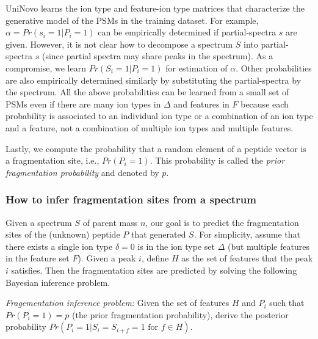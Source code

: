  UniNovo learns the ion type and feature-ion type matrices that characterize  the generative model of the PSMs in the training dataset.  For example, $\alpha=Pr(s_{i}=1|P_i=1)$ can be empirically determined if partial-spectra $s$ are given. However, it is not clear how to decompose a spectrum $S$ into partial-spectra $s$ (since partial spectra may share peaks in the spectrum). As a compromise, we learn $Pr(S_{i}=1|P_i=1)$ for estimation of $\alpha$. Other probabilities are also empirically determined similarly by substituting the partial-spectra by the spectrum. 
%
All the above probabilities can be learned from a small set of PSMs 
even if there are many ion types in $\Delta$ and features in $F$ because each probability is associated to an individual ion type  or a combination of an ion type and a feature, not a combination of multiple ion types and multiple features. 
 
 Lastly, we compute the probability that a random element of a peptide vector is a fragmentation site, i.e., $Pr(P_i=1)$.
 This probability is called the {\em prior fragmentation probability} and denoted by $p$.  

 
 

\subsubsection{How to infer fragmentation sites from a spectrum} Given a spectrum $S$ of parent mass $n$, our goal is to predict the fragmentation sites of the (unknown) peptide $P$ that generated $S$. For simplicity, assume that there exists a single ion type $\delta=0$ is in the ion type set $\Delta$ (but multiple features in the feature set $F$). Given a peak $i$, define $H$ as the set of features that the peak $i$ satisfies. Then the fragmentation sites are predicted by solving the following Bayesian inference problem. 


{\em Fragementation inference problem: } Given the set of features $H$ and $P_i$ such that $Pr(P_i=1)=p$ (the prior fragmentation probability),  derive the posterior probability $Pr(P_i=1|S_i= S_{i+f}=1\text{ for }f\in H)$.
\\

